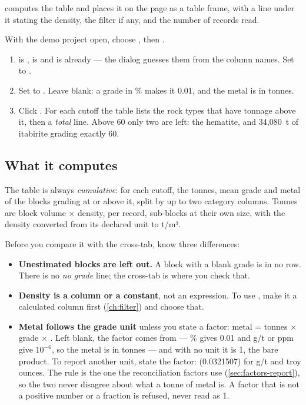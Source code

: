  computes the table and places it on the page as a table frame, with a line under it stating the density, the filter if any, and the number of records read.

\begin{tryit}
With the demo project open, choose , then .
\begin{enumerate}
\item {} is ,  is  and  is  already — the dialog guesses them from the column names. Set  to .
\item Set  to \code{\%}. Leave  blank: a grade in \% makes it 0.01, and the metal is in tonnes.
\item Click . For each cutoff the table lists the rock types that have tonnage above it, then a \emph{total} line. Above 60 only two are left: the hematite, and 34,080~t of itabirite grading exactly 60.
\end{enumerate}
\end{tryit}


\subsection{What it computes}
The table is always \emph{cumulative}: for each cutoff, the tonnes, mean grade and metal of the blocks grading at or above it, split by up to two category columns. Tonnes are block volume × density, per record, sub-blocks at their own size, with the density converted from its declared unit to t/m³.

Before you compare it with the cross-tab, know three differences:

\begin{itemize}
\item \textbf{Unestimated blocks are left out.} A block with a blank grade is in no row. There is no \emph{no grade} line; the cross-tab is where you check that.
\item \textbf{Density is a column or a constant}, not an expression. To use , make it a calculated column first (\cref{ch:filter}) and choose that.
\item \textbf{Metal follows the grade unit} unless you state a factor: metal = tonnes × grade × . Left blank, the factor comes from  — \% gives 0.01 and g/t or ppm give $10^{-6}$, so the metal is in tonnes — and with no unit it is 1, the bare product. To report another unit, state the factor:  (0.0321507) for g/t and troy ounces. The rule is the one the reconciliation factors use (\cref{sec:factors-report}), so the two never disagree about what a tonne of metal is. A factor that is not a positive number or a fraction is refused, never read as 1.
\end{itemize}

